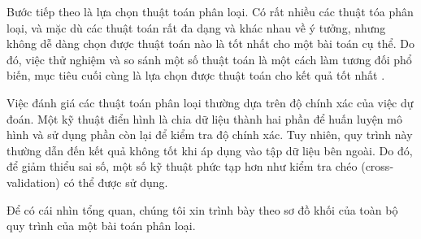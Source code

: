 Bước tiếp theo là lựa chọn thuật toán phân loại. Có rất nhiều các thuật tóa phân loại, và mặc dù các thuật toán rất đa dạng và khác nhau về ý tưởng, nhưng không dễ dàng chọn được thuật toán nào là tốt nhất cho một bài toán cụ thể. Do đó, việc thử nghiệm và so sánh một số thuật toán là một cách làm tương đối phổ biến, mục tiêu cuối cùng là lựa chọn được thuật toán cho kết quả tốt nhất \cite{kotsiantis2007supervised}.

Việc đánh giá các thuật toán phân loại thường dựa trên độ chính xác của việc dự đoán. Một kỹ thuật điển hình là chia dữ liệu thành hai phần để huấn luyện mô hình và sử dụng phần còn lại để kiểm tra độ chính xác. Tuy nhiên, quy trình này thường dẫn đến kết quả không tốt khi áp dụng vào tập dữ liệu bên ngoài. Do đó, để giảm thiểu sai số, một số kỹ thuật phức tạp hơn như kiểm tra chéo (cross-validation) \cite{kohavi1995study} có thể được sử dụng.

Để có cái nhìn tổng quan, chúng tôi xin trình bày theo sơ đồ khối của toàn bộ quy trình của một bài toán phân loại.

